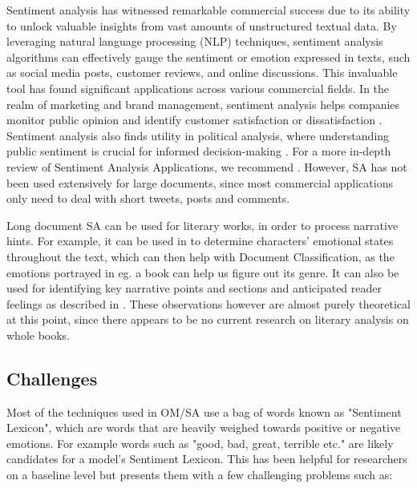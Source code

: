 \documentclass[preprint,review,12pt]{elsarticle}
\begin{document}
Sentiment analysis has witnessed remarkable commercial success due to its ability to unlock valuable insights from vast amounts of unstructured textual data. By leveraging natural language processing (NLP) techniques, sentiment analysis algorithms can effectively gauge the sentiment or emotion expressed in texts, such as social media posts, customer reviews, and online discussions. This invaluable tool has found significant applications across various commercial fields. In the realm of marketing and brand management, sentiment analysis helps companies monitor public opinion and identify customer satisfaction or dissatisfaction \cite{sa_example_1, sa_example_2, sa_example_3}. Sentiment analysis also finds utility in political analysis, where understanding public sentiment is crucial for informed decision-making \cite{sa_example_4, sa_example_5}. For a more in-depth review of Sentiment Analysis Applications, we recommend \citet{sa_applications}. However, SA has not been used extensively for large documents, since most commercial applications only need to deal with short tweets, posts and comments. 

Long document SA can be used for literary works, in order to process narrative hints. For example, it can be used in to determine characters' emotional states throughout the text, which can then help with Document Classification, as the emotions portrayed in eg. a book can help us figure out its genre. It can also be used for identifying key narrative points and sections and anticipated reader feelings as described in \citet{omori}. These observations however are almost purely theoretical at this point, since there appears to be no current research on literary analysis on whole books.


\subsection{Challenges}

Most of the techniques used in OM/SA use a bag of words known as "Sentiment Lexicon", which are words that are heavily weighed towards positive or negative emotions. For example words such as "good, bad, great, terrible etc." are likely candidates for a model's Sentiment Lexicon\cite{shelly}. This has been helpful for researchers on a baseline level but presents them with a few challenging problems such as:
\end{document}
